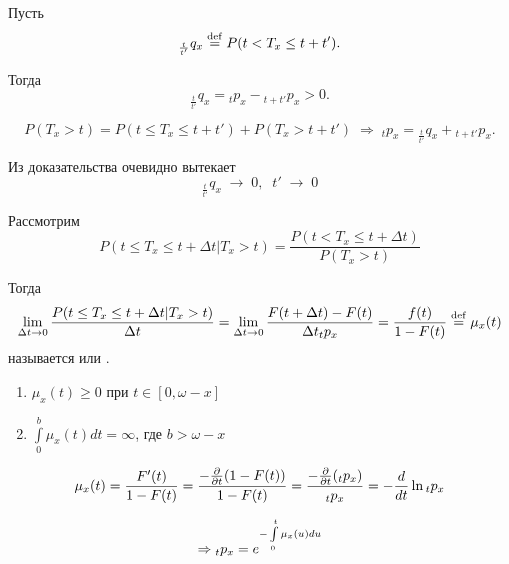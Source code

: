 \begin{clair}

	Пусть 
	$${}_{\frac{t}{t'}}q_x \mathrel{\stackrel{\rm def}=} P(t < T_x \leq t + t').$$

	Тогда 
	$${}_{\frac{t}{t'}}q_x = {}_{t}p_x - {}_{t+t'}p_x > 0.$$

\end{clair}
\begin{Proof}

	$$P(T_x > t) = P(t \leq T_x \leq t+t') + P(T_x > t+t') \; \Rightarrow \; {}_{t}p_x = {}_{\frac{t}{t'}}q_x + {}_{t+t'}p_x. $$

\end{Proof}

\begin{conseq}
	Из доказательства очевидно вытекает
	\[ {}_{\frac{t}{t'}}q_x \;\rightarrow \; 0, \;\; t'\;\rightarrow\;0\]
\end{conseq}

\begin{definition}
	Рассмотрим $$P(t \leq T_x \leq t + \Delta t| T_x > t) = \frac{P(t < T_x \leq t + \Delta t)}{P(T_x > t)} $$

	Тогда $$\lim\limits_{\Delta t \rightarrow 0}\frac{P(t \leq T_x \leq t + \Delta t| T_x > t)}{\Delta t} = \lim\limits_{\Delta t \rightarrow 0}\frac{F(t + \Delta t) - F(t)}{\Delta t {}_{t}p_x} = \frac{f(t)}{1 - F(t)} \mathrel{\stackrel{\rm def}=} \mu_x(t)$$ называется  или .
\end{definition}


\begin{properties}
	\begin{enumerate}
		\item $\mu_x(t) \geq 0 $ при $t \in [0, \omega - x]$
		\item $\int\limits_0^b\mu_x(t)dt = \infty$, где $b > \omega - x$
	\end{enumerate}
\end{properties}

\begin{remark}
	\begin{gather*}
		\mu_x(t) = \frac{F'(t)}{1-F(t)} = \frac{-\frac{\partial}{\partial t}(1-F(t))}{1-F(t)}
		= \frac{-\frac{\partial}{\partial t}({}_{t}p_x)}{{}_{t}p_x} = -\frac{d}{dt}\ln{}_{t}p_x
	\end{gather*}
		
	

	\[\Rightarrow {}_{t} p_x = e^{-\int\limits_0^t\mu_x(u)du}\]
\end{remark}


